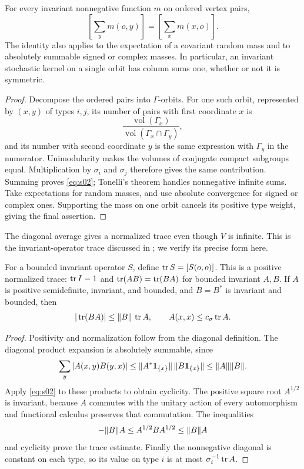\begin{lemma}\label{pre:mass-transport}
For every invariant nonnegative function $m$ on ordered vertex pairs,
\begin{equation}\label{eq:s02}
 \left[\sum_y m(o,y)\right]
 =\left[\sum_x m(x,o)\right].
\end{equation}
The identity also applies to the expectation of a covariant random
mass and to absolutely summable signed or complex masses.
In particular, an invariant stochastic kernel on a single orbit has
column sums one, whether or not it is symmetric.
\end{lemma}
\begin{proof}
Decompose the ordered pairs into $\Gamma$-orbits. For one such orbit,
represented by $(x,y)$ of types $i,j$, its number of pairs with first
coordinate $x$ is
\[
 \frac{\operatorname{vol}(\Gamma_x)}
 {\operatorname{vol}(\Gamma_x\cap\Gamma_y)},
\]
and its number with second coordinate $y$ is the same expression with
$\Gamma_y$ in the numerator. Unimodularity makes the volumes of
conjugate compact subgroups equal. Multiplication by $\sigma_i$ and
$\sigma_j$ therefore gives the same contribution. Summing proves
\eqref{eq:s02}; Tonelli's theorem handles nonnegative infinite sums.
Take expectations for random masses, and use absolute convergence for
signed or complex ones. Supporting the mass on one orbit cancels its
positive type weight, giving the final assertion.
\end{proof}

The diagonal average gives a normalized trace even though $V$ is
infinite. This is the invariant-operator trace discussed in
\cite[Section~5]{AldousLyons2007}; we verify its precise form here.

\begin{lemma}\label{pre:trace}
For a bounded invariant operator $S$, define
$\operatorname{tr} S=[S(o,o)]$. This is a positive normalized trace:
$\operatorname{tr} I=1$ and $\operatorname{tr}(AB)=\operatorname{tr}(BA)$ for bounded invariant $A,B$.
If $A$ is positive semidefinite, invariant, and bounded, and $B=B^*$
is invariant and bounded,
then
\[
 |\operatorname{tr}(BA)|\le\lVert B\rVert\,\operatorname{tr} A,
 \qquad A(x,x)\le c_\sigma\operatorname{tr} A.
\]
\end{lemma}
\begin{proof}
Positivity and normalization follow from the diagonal definition.
The diagonal product expansion is absolutely summable, since
\[
 \sum_y|A(x,y)B(y,x)|
 \le\lVert A^*\mathbf 1_{\{x\}}\rVert\,
       \lVert B\mathbf 1_{\{x\}}\rVert\le\lVert A\rVert\lVert B\rVert.
\]
Apply \eqref{eq:s02} to these products to obtain cyclicity.
The positive square root $A^{1/2}$ is invariant, because $A$ commutes
with the unitary action of every automorphism and functional calculus
preserves that commutation. The inequalities
\[
 -\lVert B\rVert A\le A^{1/2}BA^{1/2}\le\lVert B\rVert A
\]
and cyclicity prove the trace estimate. Finally the nonnegative
diagonal is constant on each type, so its value on type $i$ is at
most $\sigma_i^{-1}\operatorname{tr} A$.
\end{proof}

